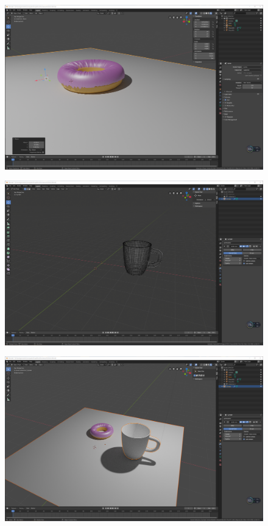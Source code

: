 \documentclass[logo,reportComp]{thesis}
\begin{document}
\begin{figure}[H]
\centering
\includegraphics[width=\linewidth]{fig/v4-1.png}
\end{figure}
\begin{figure}[H]
\centering
\includegraphics[width=\linewidth]{fig/v5.png}
\end{figure}
\begin{figure}[H]
\centering
\includegraphics[width=\linewidth]{fig/v5-2.png}
\end{figure}
\end{document}
